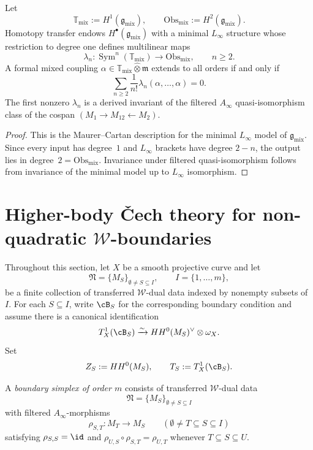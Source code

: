 \begin{theorem}
\label{thm:universal-interaction-brackets}
Let
\[
\mathbb T_{\mathrm{mix}}:=H^1(\mathfrak g_{\mathrm{mix}}),
\qquad
\mathrm{Obs}_{\mathrm{mix}}:=H^2(\mathfrak g_{\mathrm{mix}}).
\]
Homotopy transfer endows $H^\bullet(\mathfrak g_{\mathrm{mix}})$ with a minimal $L_\infty$ structure whose restriction to degree one defines multilinear maps
\[
\lambda_n : \operatorname{Sym}^n(\mathbb T_{\mathrm{mix}}) \longrightarrow \mathrm{Obs}_{\mathrm{mix}},
\qquad n\ge 2.
\]
A formal mixed coupling $\alpha\in \mathbb T_{\mathrm{mix}}\widehat\otimes \mathfrak m$ extends to all orders if and only if
\[
\sum_{n\ge 2}\frac{1}{n!}\lambda_n(\alpha,\dots,\alpha)=0.
\]
The first nonzero $\lambda_n$ is a derived invariant of the filtered $A_\infty$ quasi-isomorphism class of the cospan $(M_1\to M_{12}\leftarrow M_2)$.
\end{theorem}

\begin{proof}
This is the Maurer--Cartan description for the minimal $L_\infty$ model of $\mathfrak g_{\mathrm{mix}}$. Since every input has degree~$1$ and $L_\infty$ brackets have degree $2-n$, the output lies in degree~$2 = \mathrm{Obs}_{\mathrm{mix}}$. Invariance under filtered quasi-isomorphism follows from invariance of the minimal model up to $L_\infty$ isomorphism.
\end{proof}


\section{Higher-body \v{C}ech theory for non-quadratic $\mathcal W$-boundaries}
\label{sec:w-boundary-cech-theory}

\begin{convention}
\label{conv:derived-tangent-center-input}
Throughout this section, let $X$ be a smooth projective curve and let
\[
\mathfrak N=\{M_S\}_{\emptyset\neq S\subseteq I},\qquad I=\{1,\dots,m\},
\]
be a finite collection of transferred $\mathcal W$-dual data indexed by nonempty subsets of $I$.
For each $S\subseteq I$, write $\cB_S$ for the corresponding boundary condition and assume there is a canonical identification
\[
T^1_X(\cB_S)
\xrightarrow{\sim}
HH^0(M_S)^\vee\otimes \omega_X.
\]
Set
\[
Z_S:=HH^0(M_S),\qquad T_S:=T^1_X(\cB_S).
\]
\end{convention}

\begin{definition}
\label{def:w-boundary-simplex}
A \emph{boundary simplex of order $m$} consists of transferred $\mathcal W$-dual data
\[
\mathfrak N=\{M_S\}_{\emptyset\neq S\subseteq I}
\]
with filtered $A_\infty$-morphisms
\[
\rho_{S,T}\colon M_T\longrightarrow M_S
\qquad (\emptyset\neq T\subseteq S\subseteq I)
\]
satisfying $\rho_{S,S}=\id$ and $\rho_{U,S}\circ \rho_{S,T}=\rho_{U,T}$ whenever
$T\subseteq S\subseteq U$.
\end{definition}

